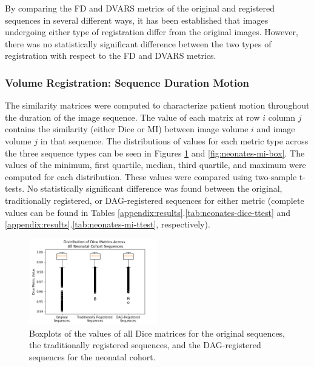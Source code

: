 By comparing the FD and DVARS metrics of the original and registered sequences in several different ways, it has been established that images undergoing either type of registration differ from the original images. However, there was no statistically significant difference between the two types of registration with respect to the FD and DVARS metrics.

\subsubsection{Volume Registration: Sequence Duration Motion}

The similarity matrices were computed to characterize patient motion throughout the duration of the image sequence. The value of each matrix at row $i$ column $j$ contains the similarity (either Dice or MI) between image volume $i$ and image volume $j$ in that sequence. The distributions of values for each metric type across the three sequence types can be seen in Figures \ref{fig:neonates-dice-box} and \ref{fig:neonates-mi-box}. The values of the minimum, first quartile, median, third quartile, and maximum were computed for each distribution. These values were compared using two-sample t-tests. No statistically significant difference was found between the original, traditionally registered, or DAG-registered sequences for either metric (complete values can be found in Tables \ref{appendix:results}.\ref{tab:neonates-dice-ttest} and \ref{appendix:results}.\ref{tab:neonates-mi-ttest}, respectively).

\begin{figure}
\centering
\includegraphics[width=0.5\textwidth]{6/figures/neonates-dice-box.png}
\caption{Boxplots of the values of all Dice matrices for the original sequences, the traditionally registered sequences, and the DAG-registered sequences for the neonatal cohort.}
\label{fig:neonates-dice-box}
\end{figure}

